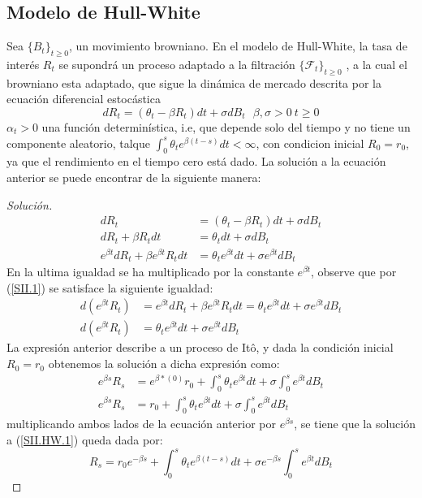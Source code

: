 \documentclass[11pt,notitlepage]{article}
\newenvironment{solucion}
  {\begin{proof}[Solución]}
  {\end{proof}}
\begin{document}
        \subsection{Modelo de Hull-White}
        Sea \(\{B_{t}\}_{t\geq0}\), un movimiento browniano. En el modelo de Hull-White, la tasa de interés \(R_t\) se supondrá un proceso adaptado a la filtración
        \(\{\mathcal{F}_{t}\}_{t\geq0}\) , a la cual el browniano esta adaptado, que sigue la dinámica de mercado descrita por la ecuación diferencial estocástica 
        \begin{equation}\label{SII.HW.1}
            dR_t = (\theta_t - \beta R_t)dt + \sigma dB_t \ \ \ \beta,\sigma >0 \ t \geq 0 
        \end{equation}
        \(\alpha_t > 0\) una función determinística, i.e, que depende solo del tiempo y no tiene un componente aleatorio, talque \(\int_{0}^{s}\theta_{t}e^{\beta(t-s)}dt < \infty\), con condicion inicial \(R_0 = r_0\), ya que el rendimiento en el tiempo cero está dado. La solución a la ecuación anterior se puede encontrar de la siguiente manera:   
        \begin{solucion}
        \begin{align*}
            dR_t &= (\theta_t - \beta R_t)dt + \sigma dB_t\\
            dR_t +\beta R_t dt &= \theta_t dt + \sigma dB_t\\ 
            e^{\beta t}dR_t +\beta e^{\beta t}R_t dt &= \theta_t e^{\beta t}dt + \sigma e^{\beta t}dB_t
        \end{align*} 
        En la ultima igualdad se ha multiplicado por la constante \(e^{\beta t}\), observe que por (\ref{SII.1}) se satisface 
        la siguiente igualdad: 
        \begin{align*}
            d\left(e^{\beta t}R_t \right)&=e^{\beta t}dR_t +\beta e^{\beta t}R_t dt = \theta_t e^{\beta t}dt + \sigma e^{\beta t}dB_t\\
            d\left(e^{\beta t}R_t \right)&=\theta_t e^{\beta t}dt + \sigma e^{\beta t}dB_t
        \end{align*}
        La expresión anterior describe a un proceso  de Itô, y dada la condición inicial \(R_0 = r_0\) obtenemos la solución a dicha expresión como: 
        \begin{align*}
            e^{\beta s}R_s  &=  e^{\beta*(0)}r_0 + \int_{0}^{s}\theta_{t}e^{\beta t}dt + \sigma\int_{0}^{s}e^{\beta t}dB_t \\
            e^{\beta s}R_s  &= r_0 + \int_{0}^{s}\theta_{t}e^{\beta t}dt  + \sigma\int_{0}^{s}e^{\beta t}dB_t
        \end{align*}
         multiplicando ambos lados de la ecuación anterior por \(e^{\beta s}\), se tiene que la solución a (\ref{SII.HW.1}) queda dada por:
         \begin{equation}\label{SII.HW.2}
             R_s  = r_0e^{-\beta s} + \int_{0}^{s}\theta_{t}e^{\beta(t-s)}dt + \sigma e^{-\beta s}\int_{0}^{s}e^{\beta t}dB_t
         \end{equation}
        \end{solucion}
\end{document}
